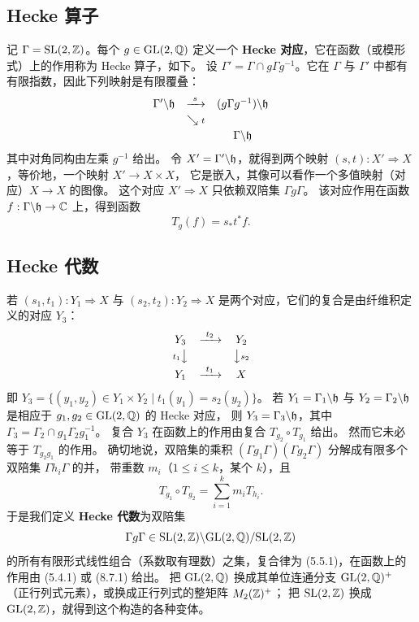 \subsection{Hecke 算子}

记 $\Gamma=\mathrm{SL}(2,\mathbb{Z})$。每个 $g\in\mathrm{GL}(2,\mathbb{Q})$ 定义一个 \textbf{Hecke 对应}，它在函数（或模形式）上的作用称为 Hecke 算子，如下。
设 $\Gamma'=\Gamma\cap g\Gamma g^{-1}$。它在 $\Gamma$ 与 $\Gamma'$ 中都有有限指数，因此下列映射是有限覆叠：
\[
\begin{array}{ccc}
\Gamma'\backslash\mathfrak{h} & \xrightarrow{\ s\ } & (g\Gamma g^{-1})\backslash\mathfrak{h}\\[2pt]
& \searrow{\scriptstyle t} & \\[2pt]
& & \Gamma\backslash\mathfrak{h}
\end{array}
\]
其中对角同构由左乘 $g^{-1}$ 给出。
令 $X'=\Gamma'\backslash\mathfrak{h}$，就得到两个映射 $(s,t):X'\Rightarrow X$，等价地，一个映射 $X'\to X\times X$，
它是嵌入，其像可以看作一个多值映射（对应）$X\to X$ 的图像。
这个对应 $X'\Rightarrow X$ 只依赖双陪集 $\Gamma g\Gamma$。
该对应作用在函数 $f:\Gamma\backslash\mathfrak{h}\to\mathbb{C}$ 上，得到函数
\begin{equation*}
T_g(f)=s_*t^*f .
\tag{5.4.1}
\end{equation*}

\subsection{Hecke 代数}

若 $(s_1,t_1):Y_1\Rightarrow X$ 与 $(s_2,t_2):Y_2\Rightarrow X$ 是两个对应，它们的复合是由纤维积定义的对应 $Y_3$：
\[
\begin{array}{ccc}
Y_3 & \xrightarrow{\ t_2\ } & Y_2\\[2pt]
{\scriptstyle t_1}\big\downarrow & & \big\downarrow{\scriptstyle s_2}\\[2pt]
Y_1 & \xrightarrow{\ t_1\ } & X
\end{array}
\]
即 $Y_3=\{(y_1,y_2)\in Y_1\times Y_2\mid t_1(y_1)=s_2(y_2)\}$。
若 $Y_1=\Gamma_1\backslash\mathfrak{h}$ 与 $Y_2=\Gamma_2\backslash\mathfrak{h}$ 是相应于 $g_1,g_2\in\mathrm{GL}(2,\mathbb{Q})$ 的 Hecke 对应，
则 $Y_3=\Gamma_3\backslash\mathfrak{h}$，其中 $\Gamma_3=\Gamma_2\cap g_1\Gamma_2g_1^{-1}$。
复合 $Y_3$ 在函数上的作用由复合 $T_{g_2}\circ T_{g_1}$ 给出。
然而它未必等于 $T_{g_2g_1}$ 的作用。
确切地说，双陪集的乘积 $(\Gamma g_1\Gamma)(\Gamma g_2\Gamma)$ 分解成有限多个双陪集 $\Gamma h_i\Gamma$ 的并，
带重数 $m_i$（$1\le i\le k$，某个 $k$），且
\begin{equation*}
T_{g_1}\circ T_{g_2}=\sum_{i=1}^{k}m_iT_{h_i}.
\tag{5.5.1}
\end{equation*}
于是我们定义 \textbf{Hecke 代数}为双陪集
\[
\Gamma g\Gamma\in\mathrm{SL}(2,\mathbb{Z})\backslash\mathrm{GL}(2,\mathbb{Q})/\mathrm{SL}(2,\mathbb{Z})
\]
的所有有限形式线性组合（系数取有理数）之集，复合律为 (5.5.1)，在函数上的作用由 (5.4.1) 或 (8.7.1) 给出。
把 $\mathrm{GL}(2,\mathbb{Q})$ 换成其单位连通分支 $\mathrm{GL}(2,\mathbb{Q})^+$（正行列式元素），或换成正行列式的整矩阵 $M_2(\mathbb{Z})^+$；
把 $\mathrm{SL}(2,\mathbb{Z})$ 换成 $\mathrm{GL}(2,\mathbb{Z})$，就得到这个构造的各种变体。

